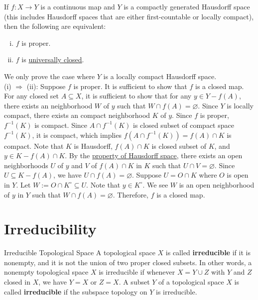 \documentclass{report}
\begin{document}
\begin{proposition}{}{}
	If $f: X \rightarrow Y$ is a continuous map and $Y$ is a compactly generated Hausdorff space (this includes Hausdorff spaces that are either first-countable or locally compact), then the following are equivalent:
	\begin{enumerate}[(i)]
		\item $f$ is proper.
		\item $f$ is \hyperref[th:universally_closed_map]{universally closed}.
	\end{enumerate}
\end{proposition}

\begin{prf}
	We only prove the case where $Y$ is a locally compact Hausdorff space.\\
	(i) $\Rightarrow$ (ii): Suppose $f$ is proper. It is sufficient to show that $f$ is a closed map. For any closed set $A\subseteq X$, it is sufficient to show that for any $y\in Y-f(A)$, there exists an neighborhood $W$ of $y$ such that $W\cap f(A)=\varnothing$. Since $Y$ is locally compact, there exists an compact neighborhood $K$ of $y$. Since $f$ is proper, $f^{-1}(K)$ is compact. Since $A\cap f^{-1}(K)$ is closed subset of compact space $f^{-1}(K)$, it is compact, which implies $f\left(A\cap f^{-1}(K)\right)=f(A)\cap K$ is compact. Note that $K$ is Hausdorff, $f(A)\cap K$ is closed subset of $K$, and $y\in K-f(A)\cap K$.
	By the \hyperref[th:properties_of_hausdorff_space]{property of Hausdorff space}, there exists an open neighborhoods $U$ of $y$ and $V$ of $f(A)\cap K$ in $K$ such that $U\cap V=\varnothing$. Since $U\subseteq K - f(A)$, we have $U\cap f(A)=\varnothing$. Suppose $U=O \cap K$ where $O$ is open in $Y$. Let $W:=O\cap K^{\circ}\subseteq U$. Note that $y\in  K^{\circ}$. We see $W$ is an open neighborhood of $y$ in $Y$ such that $W\cap f(A)=\varnothing$. Therefore, $f$ is a closed map. 
\end{prf}

\section{Irreducibility}
\begin{definition}{Irreducible Topological Space}{}
	A topological space $X$ is called \textbf{irreducible} if it is nonempty, and it is not the union of two proper closed subsets. In other words, a nonempty topological space $X$ is irreducible if whenever $X=Y \cup Z$ with $Y$ and $Z$ closed in $X$, we have $Y=X$ or $Z=X$. A subset $Y$ of a topological space $X$ is called \textbf{irreducible} if the subspace topology on $Y$ is irreducible.
\end{definition}
\end{document}
